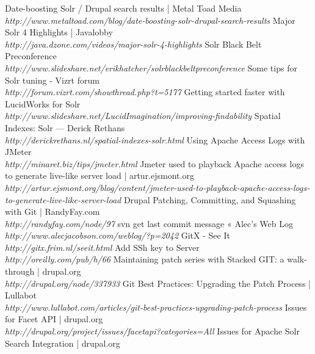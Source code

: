 \begin{thebibliography}{99}
		Date-boosting Solr / Drupal search results | Metal Toad Media\\
		\emph{http://www.metaltoad.com/blog/date-boosting-solr-drupal-search-results}
		Major Solr 4 Highlights | Javalobby\\
		\emph{http://java.dzone.com/videos/major-solr-4-highlights}
		Solr Black Belt Pre\-conference \\
		\emph{http://www.slideshare.net/erikhatcher/solr\-black\-belt\-preconference}
		Some tips for Solr tuning - Vizrt forum\\
		\emph{http://forum.vizrt.com/showthread.php?t=5177}
		Getting started faster with LucidWorks for Solr \\
		\emph{http://www.slideshare.net/LucidImagination/improving-findability}
		Spatial Indexes: Solr — Derick Rethans \\
		\emph{http://derickrethans.nl/spatial-indexes-solr.html}
		Using Apache Access Logs with JMeter \\
		\emph{http://minaret.biz/tips/jmeter.html}
		Jmeter used to playback Apache access logs to generate live-like server load | artur.ejsmont.org \\
		\emph{http://artur.ejsmont.org/blog/content/jmeter-used-to-playback-apache-access-logs-to-generate-live-like-server-load}
		Drupal Patching, Committing, and Squashing with Git | RandyFay.com\\
		\emph{http://randyfay.com/node/97}
		svn get last commit message « Alec's Web Log \\
		\emph{http://www.alecjacobson.com/weblog/?p=2042}
		GitX - See It \\
		\emph{http://gitx.frim.nl/seeit.html}
		Add SSh key to Server \\
		\emph{http://oreilly.com/pub/h/66}
		Maintaining patch series with Stacked GIT: a walk-through | drupal.org \\
		\emph{http://drupal.org/node/337933}
		Git Best Practices: Upgrading the Patch Process | Lullabot \\
		\emph{http://www.lullabot.com/articles/git-best-practices-upgrading-patch-process}
		Issues for Facet API | drupal.org\\
		\emph{http://drupal.org/project/issues/facetapi?categories=All}
		Issues for Apache Solr Search Integration | drupal.org\\

\end{thebibliography}
